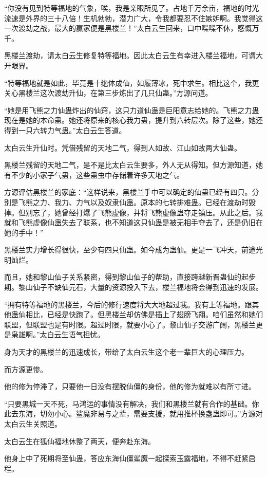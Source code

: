 \begin{this_body}
“你没有见到特等福地的气象，唉，我是亲眼所见了。占地千万余亩，福地的时光流速是外界的三十八倍！生机勃勃，潜力广大，令我都要忍不住嫉妒啊。我觉得这一次渡劫之战，最大的赢家便是黑楼兰！”太白云生回来，口中喋喋不休，感慨万千。

黑楼兰渡劫，请太白云生修复特等福地。因此太白云生有幸进入楼兰福地，可谓大开眼界。

“特等福地就是如此，毕竟是十绝体成仙，如履薄冰，死中求生。相比这个，我更关心黑楼兰这次渡劫升仙，在第三步炼出了几只仙蛊。”方源问道。

“她是用飞熊之力仙蛊炸出的仙窍，这只力道仙蛊是巨阳意志给她的。飞熊之力蛊现在是她的本命蛊。她还将原来的核心我力蛊，提升到六转层次。除了这些，她还得到一只六转力气蛊。”太白云生答道。

太白云生升仙时。凭借残留的天地二气，得到人如故、江山如故两大仙蛊。

黑楼兰残留的天地二气，是不是比太白云生要多，外人无从得知。但方源知道，她有不少的小家子气蛊，这些蛊虫中存储着许多天地之气。

方源评估黑楼兰的家底：“这样说来，黑楼兰手中可以确定的仙蛊已经有四只。分别是飞熊之力、我力、力气以及奴隶仙蛊。原本的七转排难蛊。已经在渡劫时毁掉。但别忘了，她曾经打爆了飞熊虚像，并将飞熊虚像蛊夺走镇压。从此之后。我就和飞熊虚像仙蛊失去了联系，也不知道这只仙蛊是被无相手夺去了，还是仍旧在她的手中！”

黑楼兰实力增长得很快，至少有四只仙蛊。如今成为蛊仙。更是一飞冲天，前途光明灿烂。

而且，她和黎山仙子关系紧密，得到黎山仙子的帮助，直接跨越新晋蛊仙的起步期。黎山仙子不缺仙元石，大量的资源投入下去，楼兰福地将会得到迅速的发展。

“拥有特等福地的黑楼兰，今后的修行速度将大大地超过我。我有上等福地。跟其他蛊仙相比，已经是快跑了。但黑楼兰却仿佛是插上了翅膀飞翔。咱们虽然和她们联盟，但联盟也是有时限。超过时限，就要小心了。黎山仙子交游广阔，黑楼兰更是枭雄啊。”太白云生语气担忧。

身为天才的黑楼兰的迅速成长，带给了太白云生这个老一辈巨大的心理压力。

而方源更惨。

他的修为停滞了，只要他一日没有摆脱仙僵的身份，他的修为就难以有所寸进。

“只要黑城一天不死，马鸿运的事情没有解决，我们和黑楼兰就有合作的基础。你此去东海，切勿小心。鲨魔非易与之辈，需要支援，就用推杯换盏蛊即可。”方源对太白云生关照道。

太白云生在狐仙福地休整了两天，便奔赴东海。

他身上中了死期将至仙蛊，答应东海仙僵鲨魔一起探索玉露福地，不得不赶紧启程。


\end{this_body}
